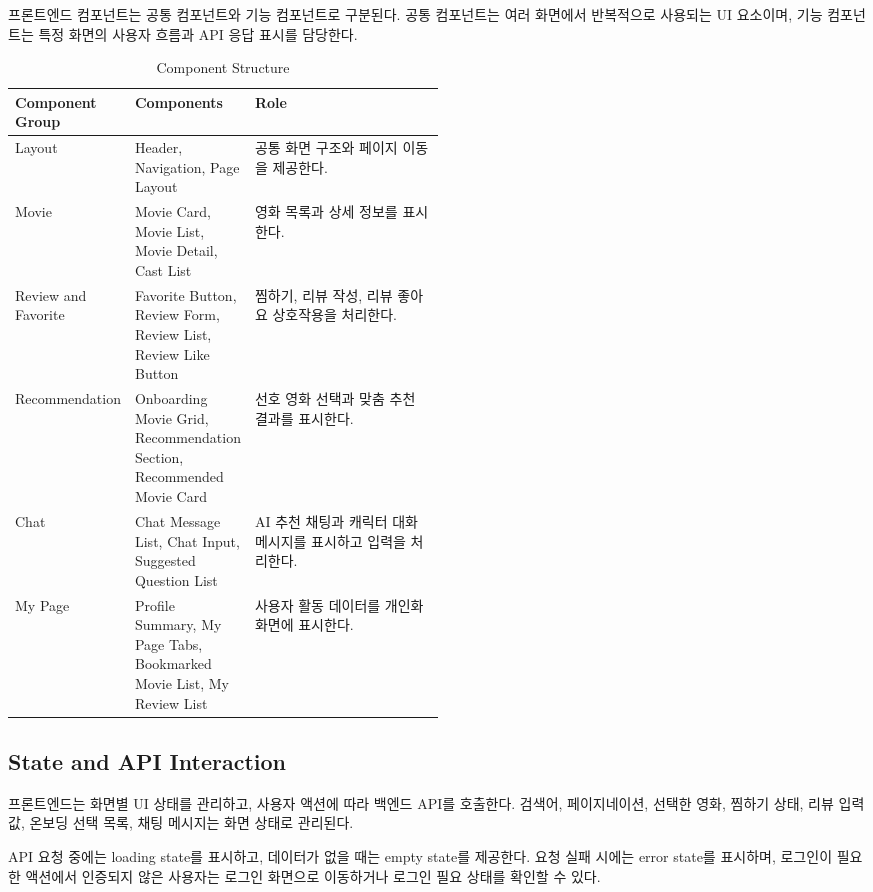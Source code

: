 \documentclass[11pt,a4paper]{article}
\renewcommand{\arraystretch}{1.18}
\begin{document}
프론트엔드 컴포넌트는 공통 컴포넌트와 기능 컴포넌트로 구분된다. 공통 컴포넌트는 여러 화면에서 반복적으로 사용되는 UI 요소이며, 기능 컴포넌트는 특정 화면의 사용자 흐름과 API 응답 표시를 담당한다.

\begin{table}[H]
\centering
\small
\setlength{\tabcolsep}{5pt}
\renewcommand{\arraystretch}{1.28}
\begin{tabularx}{\linewidth}{@{}>{\RaggedRight\arraybackslash}p{0.26\linewidth}>{\RaggedRight\arraybackslash}p{0.24\linewidth}>{\RaggedRight\arraybackslash}X@{}}
\toprule
\textbf{Component Group} & \textbf{Components} & \textbf{Role} \\
\midrule
Layout & Header, Navigation, Page Layout & 공통 화면 구조와 페이지 이동을 제공한다. \\
Movie & Movie Card, Movie List, Movie Detail, Cast List & 영화 목록과 상세 정보를 표시한다. \\
Review and Favorite & Favorite Button, Review Form, Review List, Review Like Button & 찜하기, 리뷰 작성, 리뷰 좋아요 상호작용을 처리한다. \\
Recommendation & Onboarding Movie Grid, Recommendation Section, Recommended Movie Card & 선호 영화 선택과 맞춤 추천 결과를 표시한다. \\
Chat & Chat Message List, Chat Input, Suggested Question List & AI 추천 채팅과 캐릭터 대화 메시지를 표시하고 입력을 처리한다. \\
My Page & Profile Summary, My Page Tabs, Bookmarked Movie List, My Review List & 사용자 활동 데이터를 개인화 화면에 표시한다. \\
\bottomrule
\end{tabularx}
\caption{Component Structure}
\end{table}

\hypertarget{state-and-api-interaction}{%
\subsection{State and API Interaction}\label{state-and-api-interaction}}

프론트엔드는 화면별 UI 상태를 관리하고, 사용자 액션에 따라 백엔드 API를 호출한다. 검색어, 페이지네이션, 선택한 영화, 찜하기 상태, 리뷰 입력값, 온보딩 선택 목록, 채팅 메시지는 화면 상태로 관리된다.

API 요청 중에는 loading state를 표시하고, 데이터가 없을 때는 empty state를 제공한다. 요청 실패 시에는 error state를 표시하며, 로그인이 필요한 액션에서 인증되지 않은 사용자는 로그인 화면으로 이동하거나 로그인 필요 상태를 확인할 수 있다.
\end{document}
